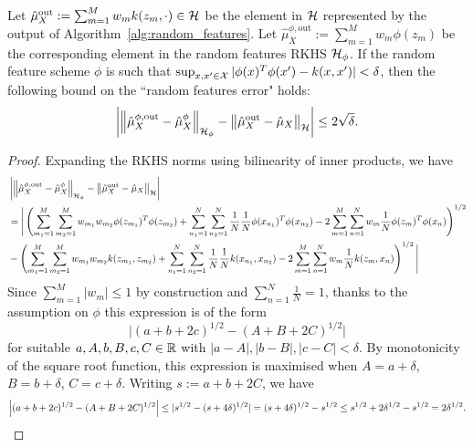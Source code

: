 \begin{lemma}
Let $\hat{\mu}^{\text{out}}_X := \sum_{m = 1}^M w_m k(z_m, \cdot) \in \mathcal{H}$ be the element in $\mathcal{H}$ represented by the output of Algorithm~\ref{alg:random_features}. Let $\hat{\mu}^{\phi, \text{out}}_X := \sum_{m = 1}^M w_m \phi(z_m)$ be the corresponding element in the random features RKHS $\mathcal{H}_{\phi}$. If the random feature scheme $\phi$ is such that $\sup_{x, x' \in \mathcal{X}} | \phi(x)^T \phi(x') - k(x, x') | < \delta$, then the following bound on the ``random features error" holds:
\begin{equation*}
\left|
\left\| \hat{\mu}^{\phi, \text{out}}_X - \hat{\mu}^{\phi}_X \right\|_{\mathcal{H}_{\phi}}
-
\left\| \hat{\mu}^{\text{out}}_X - \hat{\mu}_X \right\|_{\mathcal{H}}
\right|
\leq
2 \sqrt{\delta}
.
\end{equation*}
\label{app:lem:random_features_uniform_convergence}
\begin{proof}
Expanding the RKHS norms using bilinearity of inner products, we have
\begin{align*}
&\left|
\left\| \hat{\mu}^{\phi, \text{out}}_X - \hat{\mu}^{\phi}_X \right\|_{\mathcal{H}_{\phi}}
-
\left\| \hat{\mu}^{\text{out}}_X - \hat{\mu}_X \right\|_{\mathcal{H}}
\right|
\\&=
\Bigg| \left(
\sum_{m_1 = 1}^M \sum_{m_2 = 1}^M w_{m_1} w_{m_2} \phi(z_{m_1})^T \phi(z_{m_2})
+
\sum_{n_1 = 1}^N \sum_{n_2 = 1}^N \frac{1}{N} \frac{1}{N} \phi(x_{n_1})^T \phi(x_{n_2})
-
2 \sum_{m = 1}^M \sum_{n = 1}^N w_m \frac{1}{N} \phi(z_m)^T \phi(x_n)
\right)^{1/2}
\\&-
\left(
\sum_{m_1 = 1}^M \sum_{m_2 = 1}^M w_{m_1} w_{m_2} k(z_{m_1}, z_{m_2})
+
\sum_{n_1 = 1}^N \sum_{n_2 = 1}^N \frac{1}{N} \frac{1}{N} k(x_{n_1}, x_{n_2})
-
2 \sum_{m = 1}^M \sum_{n = 1}^N w_m \frac{1}{N} k(z_m, x_n)
\right)^{1/2} \Bigg|
\end{align*}
Since $\sum_{m = 1}^M |w_m| \leq 1$ by construction and $\sum_{n = 1}^N \frac{1}{N} = 1$, thanks to the assumption on $\phi$ this expression is of the form
\begin{equation*}
\Big| (a + b + 2c)^{1/2} - (A + B + 2C)^{1/2} \Big|
\end{equation*}
for suitable $a, A, b, B, c, C \in \mathbb{R}$ with $|a - A|, |b - B|, |c - C| < \delta$. By monotonicity of the square root function, this expression is maximised when $A = a + \delta$, $B = b + \delta$, $C = c + \delta$. Writing $s := a + b + 2C$, we have
\begin{equation*}
\Big| (a + b + 2c)^{1/2} - (A + B + 2C)^{1/2} \Big|
\leq | s^{1/2} - (s + 4 \delta)^{1/2} |
= (s + 4 \delta)^{1/2} - s^{1/2}
\leq s^{1/2} + 2 \delta^{1/2} - s^{1/2}
= 2 \delta^{1/2}
.
\qedhere
\end{equation*}
\end{proof}
\end{lemma}


